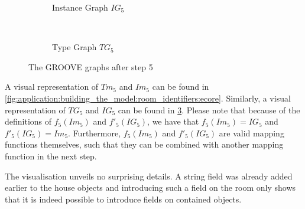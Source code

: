 \begin{figure}[p]
    \centering
    \begin{subfigure}{0.98\textwidth}
        \centering
        
        \caption{Instance Graph $IG_5$}
        \label{fig:application:building_the_model:room_identifiers:groove:instance_graph}
    \end{subfigure}
    \\
    \begin{subfigure}{0.98\textwidth}
        \centering
        
        \caption{Type Graph $TG_5$}
        \label{fig:application:building_the_model:room_identifiers:groove:type_graph}
    \end{subfigure}
    \caption{The GROOVE graphs after step 5}
    \label{fig:application:building_the_model:room_identifiers:groove}
\end{figure}

A visual representation of $Tm_5$ and $Im_5$ can be found in \cref{fig:application:building_the_model:room_identifiers:ecore}. Similarly, a visual representation of $TG_5$ and $IG_5$ can be found in \cref{fig:application:building_the_model:room_identifiers:groove}. Please note that because of the definitions of $f_5(Im_5)$ and $f'_5(IG_5)$, we have that $f_5(Im_5) = IG_5$ and $f'_5(IG_5) = Im_5$. Furthermore, $f_5(Im_5)$ and $f'_5(IG_5)$ are valid mapping functions themselves, such that they can be combined with another mapping function in the next step.

The visualisation unveils no surprising details. A string field was already added earlier to the house objects and introducing such a field on the room only shows that it is indeed possible to introduce fields on contained objects.

\afterpage{\FloatBarrier}